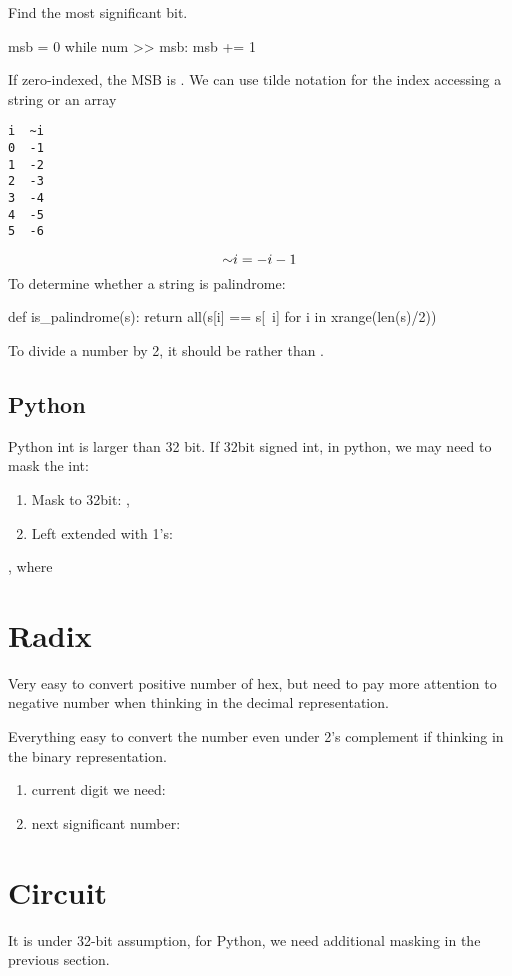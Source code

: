  Find the most significant bit. 
\begin{python}
msb = 0
while num >> msb:
  msb += 1
\end{python}
If zero-indexed, the MSB is .
 We can use tilde notation for the index accessing a string or an array
\begin{lstlisting}
i  ~i  
0  -1
1  -2
2  -3
3  -4 
4  -5 
5  -6
\end{lstlisting}
$$
\mathord{\sim} i = -i-1
$$
To determine whether a string is palindrome:
\begin{python}
def is_palindrome(s):
  return all(s[i] == s[~i] for i in xrange(len(s)/2)) 
\end{python}

 To divide a number by 2, it should be  rather than . 

\subsection{Python}
Python int is larger than 32 bit. 
If 32bit signed int, in python, we may need to mask the int:
\begin{enumerate}
\item Mask to 32bit: , 
\item Left extended with 1's: 
\end{enumerate}

, where 

\section{Radix}
 Very easy to convert positive number of hex, but need to pay more attention to negative number when thinking in the decimal representation. 

Everything easy to convert the number even under 2's complement if thinking in the binary representation. 
\begin{enumerate}
\item current digit we need: 
\item next significant number: 
\end{enumerate}
\section{Circuit}
It is under 32-bit assumption, for Python, we need additional masking in the previous section. 
